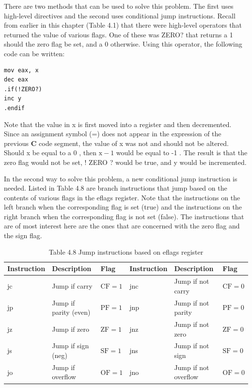 \documentclass[10pt]{article}
\begin{document}
There are two methods that can be used to solve this problem. The first uses high-level directives and the second uses conditional jump instructions. Recall from earlier in this chapter (Table 4.1) that there were high-level operators that returned the value of various flags. One of these was ZERO? that returns a 1 should the zero flag be set, and a 0 otherwise. Using this operator, the following code can be written:

\begin{verbatim}
mov eax, x
dec eax
.if(!ZERO?)
inc y
.endif
\end{verbatim}

Note that the value in x is first moved into a register and then decremented. Since an assignment symbol (=) does not appear in the expression of the previous $\mathbf{C}$ code segment, the value of x was not and should not be altered. Should x be equal to a 0 , then $\mathrm{x}-1$ would be equal to -1 . The result is that the zero flag would not be set, ! ZERO ? would be true, and y would be incremented.

In the second way to solve this problem, a new conditional jump instruction is needed. Listed in Table 4.8 are branch instructions that jump based on the contents of various flags in the eflags register. Note that the instructions on the left branch when the corresponding flag is set (true) and the instructions on the right branch when the corresponding flag is not set (false). The instructions that are of most interest here are the ones that are concerned with the zero flag and the sign flag.

\begin{table}[h]
\begin{center}
\captionsetup{labelformat=empty}
\caption{Table 4.8 Jump instructions based on eflags register}
\begin{tabular}{|l|l|l|l|l|l|}
\hline
Instruction & Description & Flag & Instruction & Description & Flag \\
\hline
jc & Jump if carry & $\mathrm{CF}=1$ & jnc & Jump if not carry & $\mathrm{CF}=0$ \\
\hline
jp & Jump if parity (even) & $\mathrm{PF}=1$ & jnp & Jump if not parity & $\mathrm{PF}=0$ \\
\hline
jz & Jump if zero & $\mathrm{ZF}=1$ & jnz & Jump if not zero & $\mathrm{ZF}=0$ \\
\hline
js & Jump if sign (neg) & $\mathrm{SF}=1$ & jns & Jump if not sign & $\mathrm{SF}=0$ \\
\hline
jo & Jump if overflow & $\mathrm{OF}=1$ & jno & Jump if not overflow & $\mathrm{OF}=0$ \\
\hline
\end{tabular}
\end{center}
\end{table}
\end{document}
